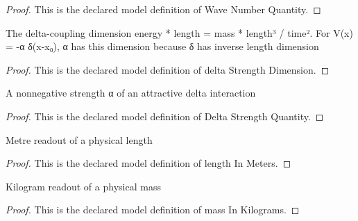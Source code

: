 \begin{proof}
  This is the declared model definition of Wave Number Quantity.
\end{proof}
\begin{definition}
  \label{def:physics:phyx-mini-0602:phyxminiproblems-problemphyxmini0602-deltastrengthdimension}
  The delta-coupling dimension energy * length = mass * length³ / time². For V(x) = -α δ(x-x₀), α has this dimension because δ has inverse length dimension
\end{definition}
\begin{proof}
  This is the declared model definition of delta Strength Dimension.
\end{proof}
\begin{definition}
  \label{def:physics:phyx-mini-0602:phyxminiproblems-problemphyxmini0602-deltastrengthquantity}
  A nonnegative strength α of an attractive delta interaction
\end{definition}
\begin{proof}
  This is the declared model definition of Delta Strength Quantity.
\end{proof}
\begin{definition}
  \label{def:physics:phyx-mini-0602:phyxminiproblems-problemphyxmini0602-lengthinmeters}
  Metre readout of a physical length
\end{definition}
\begin{proof}
  This is the declared model definition of length In Meters.
\end{proof}
\begin{definition}
  \label{def:physics:phyx-mini-0602:phyxminiproblems-problemphyxmini0602-massinkilograms}
  Kilogram readout of a physical mass
\end{definition}
\begin{proof}
  This is the declared model definition of mass In Kilograms.
\end{proof}
